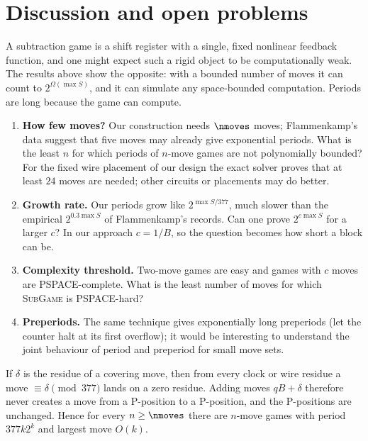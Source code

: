 \section{Discussion and open problems}

A subtraction game is a shift register with a single, fixed nonlinear feedback function, and one
might expect such a rigid object to be computationally weak.  The results above show the opposite:
with a bounded number of moves it can count to $2^{\Omega(\max S)}$, and it can simulate any
space-bounded computation.  Periods are long because the game can compute.

\begin{enumerate}[leftmargin=*]
\item \textbf{How few moves?}  Our construction needs $\nmoves$ moves; Flammenkamp's data suggest that
five moves may already give exponential periods.  What is the least $n$ for which periods of
$n$-move games are not polynomially bounded?  For the fixed wire placement of our design the exact
solver proves that at least $24$ moves are needed; other circuits or placements may do better.
\item \textbf{Growth rate.}  Our periods grow like $2^{\max S/377}$, much slower than the empirical
$2^{0.3\max S}$ of Flammenkamp's records.  Can one prove $2^{c\max S}$ for a larger $c$?  In our
approach $c=1/B$, so the question becomes how short a block can be.
\item \textbf{Complexity threshold.}  Two-move games are easy and games with $c$ moves are
PSPACE-complete.  What is the least number of moves for which \textsc{SubGame} is PSPACE-hard?
\item \textbf{Preperiods.}  The same technique gives exponentially long preperiods (let the counter
halt at its first overflow); it would be interesting to understand the joint behaviour of period and
preperiod for small move sets.
\end{enumerate}

\begin{remark}\label{rem:pad}
If $\delta$ is the residue of a covering move, then from every clock or wire residue a move
$\equiv\delta\pmod{377}$ lands on a zero residue.  Adding moves $qB+\delta$ therefore never creates a
move from a P-position to a P-position, and the P-positions are unchanged.  Hence for every
$n\ge\nmoves$ there are $n$-move games with period $377k2^k$ and largest move $O(k)$.
\end{remark}

